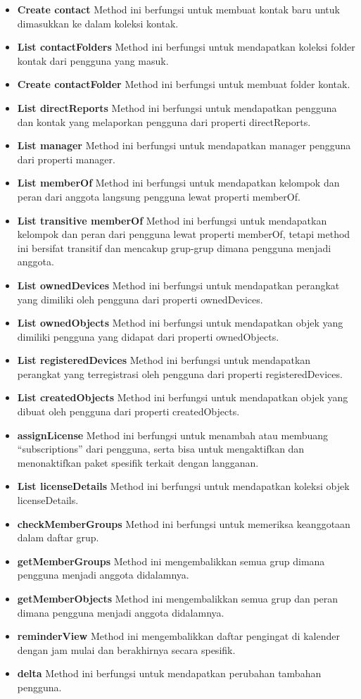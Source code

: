 \begin{itemize}
	\item \textbf{Create contact}
	Method ini berfungsi untuk membuat kontak baru untuk dimasukkan ke dalam koleksi kontak.
	\item \textbf{List contactFolders}
	Method ini berfungsi untuk mendapatkan koleksi folder kontak dari pengguna yang masuk.
	\item \textbf{Create contactFolder}
	Method ini berfungsi untuk membuat folder kontak.
	\item \textbf{List directReports}
	Method ini berfungsi untuk mendapatkan pengguna dan kontak yang melaporkan pengguna dari properti directReports.
	\item \textbf{List manager}
	Method ini berfungsi untuk mendapatkan manager pengguna dari properti manager.
	\item \textbf{List memberOf}
	Method ini berfungsi untuk mendapatkan kelompok dan peran dari anggota langsung pengguna lewat properti memberOf.
	\item \textbf{List transitive memberOf}
	Method ini berfungsi untuk mendapatkan kelompok dan peran dari pengguna lewat properti memberOf, tetapi method ini bersifat transitif dan mencakup grup-grup dimana pengguna menjadi anggota.
	\item \textbf{List ownedDevices}
	Method ini berfungsi untuk mendapatkan perangkat yang dimiliki oleh pengguna dari properti ownedDevices.
	\item \textbf{List ownedObjects}
	Method ini berfungsi untuk mendapatkan objek yang dimiliki pengguna yang didapat dari properti ownedObjects.
	\item \textbf{List registeredDevices}
	Method ini berfungsi untuk mendapatkan perangkat yang terregistrasi oleh pengguna dari properti registeredDevices.
	\item \textbf{List createdObjects}
	Method ini berfungsi untuk mendapatkan objek yang dibuat oleh pengguna dari properti createdObjects.
	\item \textbf{assignLicense}
	Method ini berfungsi untuk menambah atau membuang ``subscriptions'' dari pengguna, serta bisa untuk mengaktifkan dan menonaktifkan paket spesifik terkait dengan langganan.
	\item \textbf{List licenseDetails}
	Method ini berfungsi untuk mendapatkan koleksi objek licenseDetails.
	\item \textbf{checkMemberGroups}
	Method ini berfungsi untuk memeriksa keanggotaan dalam daftar grup.
	\item \textbf{getMemberGroups}
	Method ini mengembalikkan semua grup dimana pengguna menjadi anggota didalamnya.
	\item \textbf{getMemberObjects}
	Method ini mengembalikkan semua grup dan peran dimana pengguna menjadi anggota didalamnya.
	\item \textbf{reminderView}
	Method ini mengembalikkan daftar pengingat di kalender dengan jam mulai dan berakhirnya secara spesifik.
	\item \textbf{delta}
	Method ini berfungsi untuk mendapatkan perubahan tambahan pengguna.
\end{itemize}

